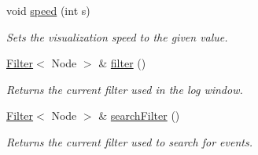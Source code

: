 \begin{DoxyCompactItemize}
void \hyperlink{structVisualizerData_afd2d2e831b4a51d1d20fcbf66a80b951}{speed} (int s)
\begin{DoxyCompactList}\small\item\em Sets the visualization speed to the given value. \end{DoxyCompactList}\item 
\hyperlink{structFilter}{Filter}$<$ Node $>$ \& \hyperlink{structVisualizerData_a22a8efbde92bd3fc7078393b90c7d71f}{filter} ()
\begin{DoxyCompactList}\small\item\em Returns the current filter used in the log window. \end{DoxyCompactList}\item 
\hyperlink{structFilter}{Filter}$<$ Node $>$ \& \hyperlink{structVisualizerData_a86ec2368f3f681b9cf73ab3d7cffee2f}{search\+Filter} ()
\begin{DoxyCompactList}\small\item\em Returns the current filter used to search for events. \end{DoxyCompactList}\end{DoxyCompactItemize}
